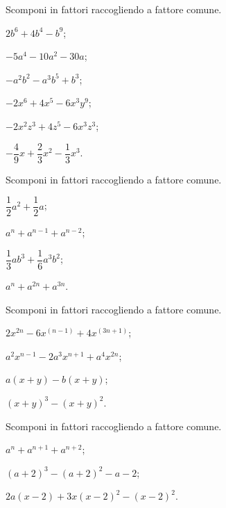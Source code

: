 \begin{esercizio}
\label{ese:15.10}
Scomponi in fattori raccogliendo a fattore comune.
\begin{multicols}{3}
\begin{enumeratea}
 \item $2b^{6}+4b^{4}-b^{9}$;
 \item $-5a^{4}-10a^{2}-30a$;
 \item $-a^{2}b^{2}-a^{3}b^{5}+b^{3}$;
 \item $-2x^{6}+4x^{5}-6x^{3}y^{9}$;
 \item $-2x^{2}z^{3}+4z^{5}-6x^{3}z^{3}$;
 \item $-{\dfrac{4}{9}}x+\dfrac{2}{3}x^{2}-\dfrac{1}{3}x^{3}$.
\end{enumeratea}
\end{multicols}
\end{esercizio}

\begin{esercizio}
\label{ese:15.11}
Scomponi in fattori raccogliendo a fattore comune.
\begin{multicols}{2}
\begin{enumeratea}
 \item $\dfrac{1}{2}a^{2}+\dfrac{1}{2}a$;
 \item $a^{n}+a^{n-1}+a^{n-2}$;
 \item $\dfrac{1}{3}ab^{3}+\dfrac{1}{6}a^{3}b^{2}$;
 \item $a^{n}+a^{2n}+a^{3n}$.
\end{enumeratea}
\end{multicols}
\end{esercizio}

\begin{esercizio}
\label{ese:15.12}
Scomponi in fattori raccogliendo a fattore comune.
\begin{multicols}{2}
\begin{enumeratea}
 \item $2x^{2n}-6x^{(n-1)}+4x^{(3n+1)}$;
 \item $a^{2}x^{n-1}-2a^{3}x^{n+1}+a^{4}x^{2n}$;
 \item $a(x+y)-b(x+y)$;
 \item $(x+y)^{3}-(x+y)^{2}$.
\end{enumeratea}
\end{multicols}
\end{esercizio}

\begin{esercizio}[\Ast]
\label{ese:15.13}
Scomponi in fattori raccogliendo a fattore comune.
 \begin{multicols}{2}
 \begin{enumeratea}
 \item $a^{n}+a^{n+1}+a^{n+2}$;
 \item $(a+2)^{3}-(a+2)^{2}-a-2$;
 \item $2a(x-2)+3x(x-2)^{2}-(x-2)^{2}$.
\end{enumeratea}
 \end{multicols}
\end{esercizio}

